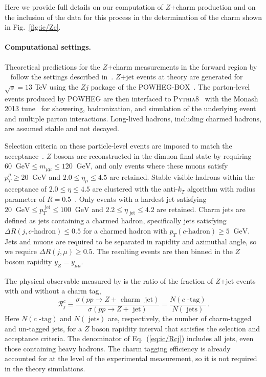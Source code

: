 
Here we provide full details on our computation of  $Z$+charm
production and on the inclusion of the \lhcb data for this
process in the determination of the charm \pdf shown in
Fig.~\ref{fig:ic/Zc}. 

\paragraph{Computational settings.}
%
Theoretical predictions for
the $Z$+charm measurements in the forward region 
by \lhcb~\cite{LHCb:2021stx} follow the 
 settings described in~\cite{Boettcher:2015sqn}.
%
$Z$+jet events at \nlo \qcd theory are generated for $\sqrt{s}= 13$ TeV  using the $Zj$ package of the
\textsc{\small POWHEG-BOX}~\cite{Alioli:2010xd}.
%
The parton-level events produced by \textsc{\small POWHEG}
are then interfaced to \textsc{\small Pythia8}~\cite{Sjostrand:2007gs}
with the Monash 2013 tune~\cite{Skands:2014pea} for showering,
hadronization, and simulation of the underlying event and multiple
parton interactions.
%
Long-lived hadrons, including charmed hadrons,
are assumed stable and not decayed.

Selection criteria on these particle-level events are imposed
to match the \lhcb acceptance~\cite{LHCb:2021stx}.
%
$Z$ bosons are reconstructed in the dimuon final state by
requiring $60~\textrm{ GeV}\le m_{\mu\mu} \le 120~\textrm{ GeV}$,
and
only events where these muons satisfy
    $p_T^\mu \ge 20~\textrm{ GeV}$ and $2.0 \le \eta_{\mu}\le 4.5$
    are retained.
%
Stable visible hadrons within the \lhcb acceptance of
$2.0 \le \eta \le 4.5$ are clustered with
the anti-$k_T$ algorithm with radius parameter
of $R=0.5$~\cite{Cacciari:2008gp}.
%
Only events with a hardest jet satisfying
  $ 20~\textrm{ GeV} \le p_T^\textrm{ jet} \le 100~\textrm{ GeV}$
and $2.2 \le \eta_\textrm{ jet}\le 4.2$ are retained.
%
Charm jets are defined as jets containing
a charmed hadron, specifically  jets satisfying
$\Delta R(j, c\textrm{-hadron})\le 0.5$ for a charmed
hadron with $p_T(c\textrm{-hadron})\ge 5~\textrm{ GeV}$.
%
Jets and muons are required to be separated
in rapidity and azimuthal angle, so
we require $\Delta R(j, \mu)\ge 0.5$.
%
The resulting events
are then binned in the $Z$ bosom rapidity $y_Z = y_{\mu \mu}$.

The physical observable measured by \lhcb is the ratio of the fraction of $Z$+jet
    events with and without a charm tag,
    \begin{equation}
    \label{eq:ic/Rcj}
        \mathcal{R}_j^c \equiv \frac{\sigma(pp\to Z+\textrm{ charm~ jet})}{\sigma(pp \to Z+\textrm{ jet})}=
         \frac{N(c\textrm{ -tag})}{ 
        N(\textrm{ jets})} \, .
    \end{equation}
 Here  $N(c\textrm{ -tag})$ and $N(\textrm{ jets})$ are, respectively, the number
    of charm-tagged and un-tagged jets, for a  $Z$ boson rapidity interval
    that satisfies the selection and acceptance criteria.
    The denominator of Eq.~(\ref{eq:ic/Rcj}) includes all jets, even those
    containing heavy hadrons.
The charm tagging efficiency is already accounted for at the level
of the experimental measurement, so it is not required in the theory
simulations.

